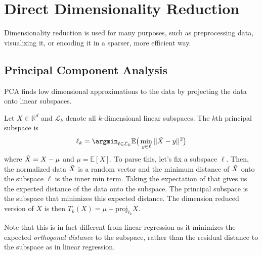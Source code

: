\section{Direct Dimensionality Reduction} 

  Dimensionality reduction is used for many purposes, such as preprocessing data, visualizing it, or encoding it in a sparser, more efficient way. 

  \subsection{Principal Component Analysis} 
    
    PCA finds low dimensional approximations to the data by projecting the data onto linear subspaces. 

    \begin{definition}
      Let $X \in \mathbb{R}^d$ and $\mathcal{L}_k$ denote all $k$-dimensional linear subspaces. The $k$th principal subspace is 
      \begin{equation}
        \ell_k = \argmin_{\ell \in \mathcal{L}_k} \mathbb{E} \big( \min_{y \in \ell} ||\Tilde{X} - y||^2 \big)
      \end{equation}
      where $\Tilde{X} = X - \mu$ and $\mu = \mathbb{E}[X]$. To parse this, let's fix a subspace $\ell$. Then, the normalized data $\Tilde{X}$ is a random vector and the minimum distance of $\Tilde{X}$ onto the subspace $\ell$ is the inner min term. Taking the expectation of that gives us the expected distance of the data onto the subspace. The principal subspace is the subspace that minimizes this expected distance. The dimension reduced version of $X$ is then $T_k (X) = \mu + \mathrm{proj}_{\ell_k} X$. 
    \end{definition}

    Note that this is in fact different from linear regression as it minimizes the expected \textit{orthogonal distance} to the subspace, rather than the residual distance to the subspace as in linear regression. 

